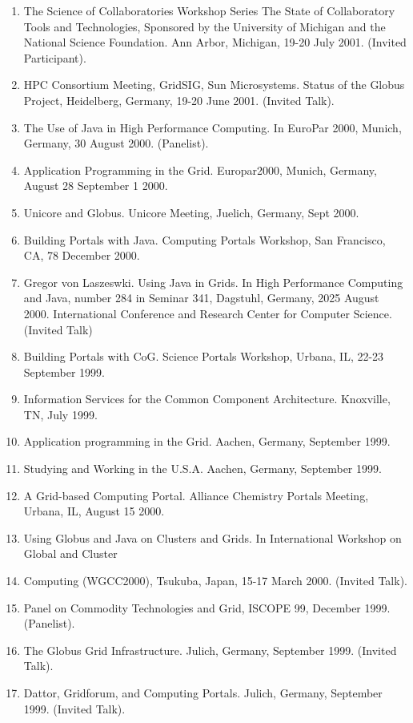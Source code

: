 \documentclass{article}
\begin{document}
\begin{enumerate}
\item  The Science of Collaboratories Workshop Series The State of Collaboratory Tools and Technologies, Sponsored by the University of Michigan and the National Science Foundation. Ann Arbor, Michigan, 19-20 July 2001. (Invited Participant). 
\item  HPC Consortium Meeting, GridSIG, Sun Microsystems. Status of the Globus Project, Heidelberg, Germany, 19-20 June 2001. (Invited Talk). %
\item  The Use of Java in High Performance Computing. In EuroPar 2000, Munich, Germany, 30 August 2000. (Panelist). 
\item  Application Programming in the Grid. Europar2000, Munich, Germany, August 28 September 1 2000. 
\item  Unicore and Globus. Unicore Meeting, Juelich, Germany, Sept 2000. 
\item  Building Portals with Java. Computing Portals Workshop, San Francisco, CA, 78 December 2000. 
\item  Gregor von Laszeswki. Using Java in Grids. In High Performance Computing and Java, number 284 in Seminar 341, Dagstuhl, Germany, 2025 August 2000. International Conference and Research Center for Computer Science. (Invited Talk) 
\item  Building Portals with CoG. Science Portals Workshop, Urbana, IL, 22-23 September 1999. 
\item  Information Services for the Common Component Architecture. Knoxville, TN, July 1999. 
\item  Application programming in the Grid. Aachen, Germany, September 1999. 
\item  Studying and Working in the U.S.A. Aachen, Germany, September 1999. 
\item  A Grid-based Computing Portal. Alliance Chemistry Portals Meeting, Urbana, IL, August 15 2000. 
\item  Using Globus and Java on Clusters and Grids. In International Workshop on Global and Cluster 
\item  Computing (WGCC2000), Tsukuba, Japan, 15-17 March 2000. (Invited Talk). 
\item  Panel on Commodity Technologies and Grid, ISCOPE 99, December 1999. (Panelist). 
\item  The Globus Grid Infrastructure. Julich, Germany, September 1999. (Invited Talk). 
\item  Dattor, Gridforum, and Computing Portals. Julich, Germany, September 1999. (Invited Talk). 

\end{enumerate}
\end{document}

